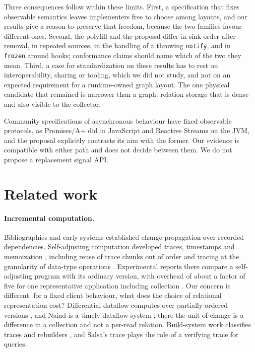 \documentclass[11pt]{article}
\begin{document}
Three consequences follow within these limits. First, a specification that fixes observable semantics leaves implementers free to choose among layouts, and our results give a reason to preserve that freedom, because the two families favour different ones. Second, the polyfill and the proposal differ in sink order after removal, in repeated sources, in the handling of a throwing \texttt{notify}, and in \texttt{frozen} around hooks; conformance claims should name which of the two they mean. Third, a case for standardization on these results has to rest on interoperability, sharing or tooling, which we did not study, and not on an expected requirement for a runtime-owned graph layout. The one physical candidate that remained is narrower than a graph: relation storage that is dense and also visible to the collector.

Community specifications of asynchronous behaviour have fixed observable protocols, as Promises/A+ \cite{promisesaplus} did in JavaScript and Reactive Streams \cite{reactivestreams} on the JVM, and the proposal explicitly contrasts its aim with the former. Our evidence is compatible with either path and does not decide between them. We do not propose a replacement signal API.

\section{Related work}
\label{sec:related}

\paragraph{Incremental computation.} Bibliographies and early systems \cite{ramalingam1993,demers1981,hudson1991,pugh1989} established change propagation over recorded dependencies. Self-adjusting computation developed traces, timestamps and memoization \cite{acar2006,acar2009}, including reuse of trace chunks out of order \cite{leywild2012} and tracing at the granularity of data-type operations \cite{acar2010}. Experimental reports there compare a self-adjusting program with its ordinary version, with overhead of about a factor of five for one representative application including collection \cite{acar2009}. Our concern is different: for a fixed client behaviour, what does the choice of relational representation cost? Differential dataflow computes over partially ordered versions \cite{mcsherry2013d}, and Naiad is a timely dataflow system \cite{murray2013}; there the unit of change is a difference in a collection and not a per-read relation. Build-system work classifies traces and rebuilders \cite{mokhov2020}, and Salsa's trace plays the role of a verifying trace for queries.
\end{document}
